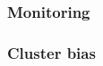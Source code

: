 \documentclass[aspectratio=1610, 12pt, xcolor=dvipsnames]{beamer}
\begin{document}
%
%

\begin{frame}\frametitle{Monitoring}

\end{frame}

\begin{frame}\frametitle{Cluster bias}

\end{frame}
\end{document}
